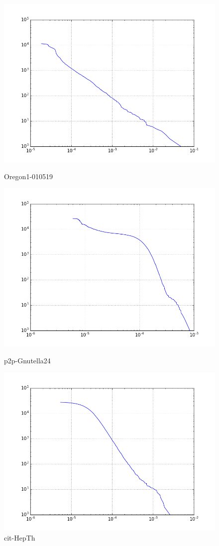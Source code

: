 \begin{figure}[H]
  \includegraphics[width=\linewidth]{img/oregon-010519/pagerank_ccdf.png}
  \caption*{Oregon1-010519}
\endminipage\hfill
{}
  \includegraphics[width=\linewidth]{img/p2p-Gnutella24/pagerank_ccdf.png}
  \caption*{p2p-Gnutella24}
\endminipage\hfill
{}
  \includegraphics[width=\linewidth]{img/cit-HepTh/pagerank_ccdf.png}
  \caption*{cit-HepTh}
\endminipage
\end{figure}

